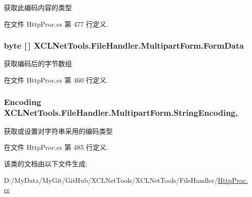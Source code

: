 获取此编码内容的类型 



在文件 Http\-Proc.\-cs 第 477 行定义.

\hypertarget{class_x_c_l_net_tools_1_1_file_handler_1_1_multipart_form_ad540886372239dbb4fcc975e694be5d9}{
\subsubsection[{Form\-Data}]{\setlength{\rightskip}{0pt plus 5cm}byte \mbox{[}$\,$\mbox{]} X\-C\-L\-Net\-Tools.\-File\-Handler.\-Multipart\-Form.\-Form\-Data\hspace{0.3cm}{\ttfamily [get]}}}\label{class_x_c_l_net_tools_1_1_file_handler_1_1_multipart_form_ad540886372239dbb4fcc975e694be5d9}


获取编码后的字节数组 



在文件 Http\-Proc.\-cs 第 460 行定义.

\hypertarget{class_x_c_l_net_tools_1_1_file_handler_1_1_multipart_form_ade83206c0e41ad24ba543ebd89e0281f}{
\subsubsection[{String\-Encoding}]{\setlength{\rightskip}{0pt plus 5cm}Encoding X\-C\-L\-Net\-Tools.\-File\-Handler.\-Multipart\-Form.\-String\-Encoding\hspace{0.3cm}{\ttfamily [get]}, {\ttfamily [set]}}}\label{class_x_c_l_net_tools_1_1_file_handler_1_1_multipart_form_ade83206c0e41ad24ba543ebd89e0281f}


获取或设置对字符串采用的编码类型 



在文件 Http\-Proc.\-cs 第 485 行定义.



该类的文档由以下文件生成\-:\begin{DoxyCompactItemize}
\item 
D\-:/\-My\-Data/\-My\-Git/\-Git\-Hub/\-X\-C\-L\-Net\-Tools/\-X\-C\-L\-Net\-Tools/\-File\-Handler/\hyperlink{_http_proc_8cs}{Http\-Proc.\-cs}\end{DoxyCompactItemize}
